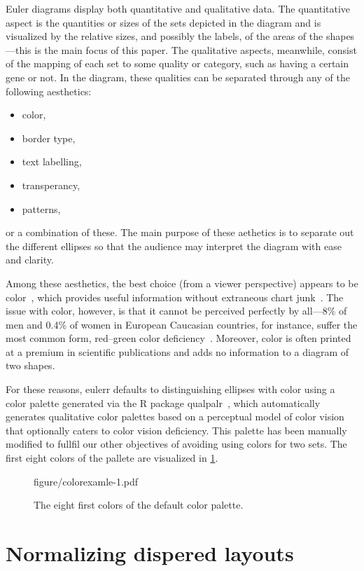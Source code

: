 \documentclass[
  oneside,
  openany,
  numbers=noendperiod,
  parskip=half,
  bibliography=totoc
]{scrbook}\usepackage[]{graphicx}\usepackage{xcolor}
\newcommand{\pkg}[1]{{\fontseries{b}\selectfont #1}}
\begin{document}
Euler diagrams display both quantitative and qualitative data. The quantitative
aspect is the quantities or sizes of the sets depicted in the diagram and is
visualized by the relative sizes, and possibly the labels, of the areas of the
shapes---this is the main focus of this paper. The qualitative aspects,
meanwhile, consist of the mapping of each set to some quality or category, such
as having a certain gene or not. In the diagram, these qualities can be
separated through any of the following aesthetics:
%
\begin{itemize}
\item color,
\item border type,
\item text labelling,
\item transperancy,
\item patterns,
\end{itemize}
%
or a combination of these. The main purpose of these aethetics is to separate
out the different ellipses so that the audience may interpret the diagram with
ease and clarity.

Among these aesthetics, the best choice (from a viewer perspective) appears to
be color~\citep{Blake_2016}, which provides useful information without
extraneous chart junk~\citep{Tufte_2001}. The issue with color, however, is that
it cannot be perceived perfectly by all---8\% of men and 0.4\% of women in
European Caucasian countries, for instance, suffer the most common form,
red--green color deficiency~\cite{Birch_2012}. Moreover, color
is often printed at a premium in scientific publications and adds no information
to a diagram of two shapes.

For these reasons, \pkg{eulerr} defaults to distinguishing ellipses with color
using a color palette generated via the R package
\pkg{qualpalr}~\citep{Larsson_2016}, which automatically generates qualitative
color palettes based on a perceptual model of color vision that optionally
caters to color vision deficiency. This palette has been manually modified
to fullfil our other objectives of avoiding using colors for two
sets. The first eight colors of the pallete are visualized in
\cref{fig:colorexample}.

\begin{figure}[htbp]
\caption{The eight first colors of the default color palette.\label{fig:colorexample}}
figure/colorexamle-1.pdf
\end{figure}

\section{Normalizing dispered layouts}
\label{sec:layout}
\end{document}
